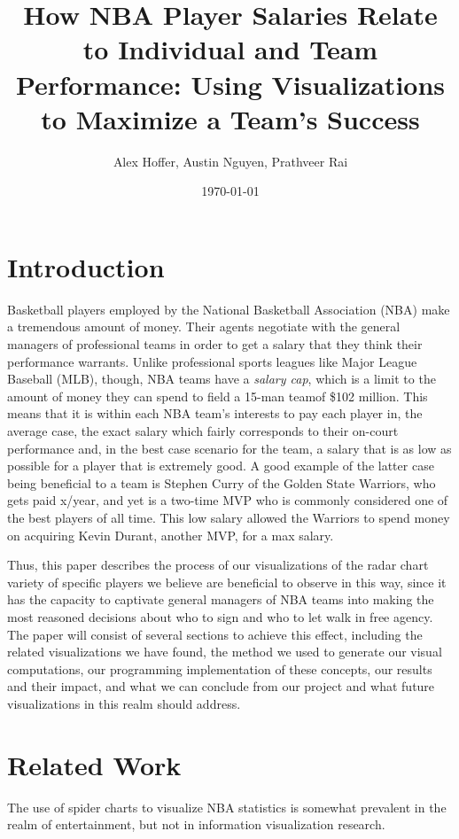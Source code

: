 \documentclass[journal]{vgtc}                %
\title{How NBA Player Salaries Relate to Individual and Team Performance: Using Visualizations to Maximize a Team's Success}
\author{Alex Hoffer, Austin Nguyen, Prathveer Rai}
\date{\today}
\begin{document}
\maketitle

\section{Introduction}
Basketball players employed by the National Basketball Association (NBA) make a tremendous amount of money. Their agents negotiate with the general managers of professional teams in order to get a salary that they think their performance warrants. Unlike professional sports leagues like Major League Baseball (MLB), though, NBA teams have a \emph{salary cap}, which is a limit to the amount of money they can spend to field a 15-man teamof \$102 million. This means that it is within each NBA team's interests to pay each player in, the average case, the exact salary which fairly corresponds to their on-court performance and, in the best case scenario for the team, a salary that is as low as possible for a player that is extremely good. A good example of the latter case being beneficial to a team is Stephen Curry of the Golden State Warriors, who gets paid x/year, and yet is a two-time MVP who is commonly considered one of the best players of all time. This low salary allowed the Warriors to spend money on acquiring Kevin Durant, another MVP, for a max salary. 
\par Thus, this paper describes the process of our visualizations of the radar chart variety of specific players we believe are beneficial to observe in this way, since it has the capacity to captivate general managers of NBA teams into making the most reasoned decisions about who to sign and who to let walk in free agency. The paper will consist of several sections to achieve this effect, including the related visualizations we have found, the method we used to generate our visual computations, our programming implementation of these concepts, our results and their impact, and what we can conclude from our project and what future visualizations in this realm should address. 

\section{Related Work}
The use of spider charts to visualize NBA statistics is somewhat prevalent in the realm of entertainment, but not in information visualization research. 
\end{document}
